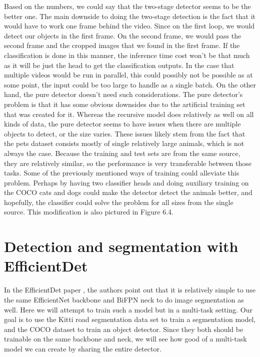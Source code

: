 Based on the numbers, we could say that the two-stage detector seems to be the better one.
The main downside to doing the two-stage detection is the fact that it would have to work one frame behind the video.
Since on the first loop, we would detect our objects in the first frame.
On the second frame, we would pass the second frame and the cropped images that we found in the first frame.
If the classification is done in this manner, the inference time cost won't be that much as it will be just the head to get the classification outputs.
In the case that multiple videos would be run in parallel, this could possibly not be possible as at some point, the input could be too large to handle as a single batch.
On the other hand, the pure detector doesn't need such considerations.
The pure detector's problem is that it has some obvious downsides due to the artificial training set that was created for it.
Whereas the recursive model does relatively as well on all kinds of data, the pure detector seems to have issues when there are multiple objects to detect, or the size varies.
These issues likely stem from the fact that the pets dataset consists mostly of single relatively large animals, which is not always the case.
Because the training and test sets are from the same source, they are relatively similar, so the performance is very transferable between those tasks.
Some of the previously mentioned ways of training could alleviate this problem.
Perhaps by having two classifier heads and doing auxiliary training on the COCO cats and dogs could make the detector detect the animals better, and hopefully, the classifier could solve the problem for all sizes from the single source.
This modification is also pictured in Figure 6.4.

\section{Detection and segmentation with EfficientDet}
In the EfficientDet paper \citep{efficientDet}, the authors point out that it is relatively simple to use the same EfficientNet backbone and BiFPN neck to do image segmentation as well.
Here we will attempt to train such a model but in a multi-task setting.
Our goal is to use the Kitti \citep{kitti} road segmentation data set to train a segmentation model, and the COCO dataset to train an object detector.
Since they both should be trainable on the same backbone and neck, we will see how good of a multi-task model we can create by sharing the entire detector.

